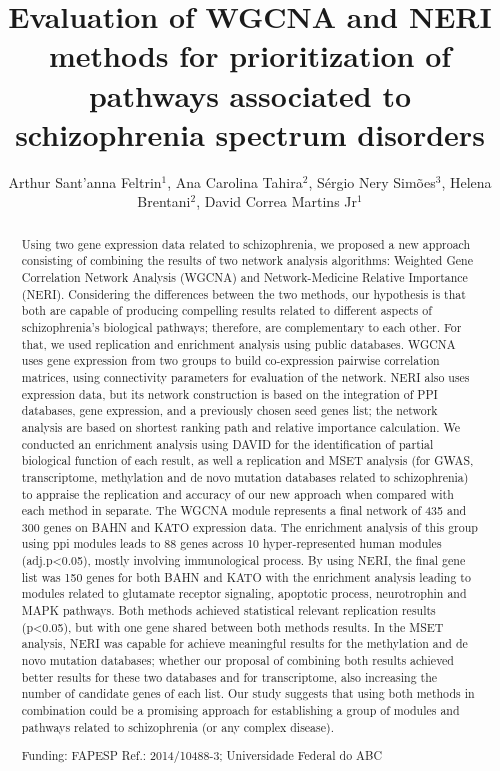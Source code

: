 \documentclass[twoside]{article}
\title{\vspace{-15mm}\fontsize{24pt}{10pt}\selectfont\textbf{Evaluation of WGCNA and NERI methods for prioritization of pathways associated to schizophrenia spectrum disorders}} %
\author{Arthur Sant'anna Feltrin$^1$, Ana Carolina Tahira$^2$, S\'ergio Nery Sim\~oes$^3$, Helena Brentani$^2$, David Correa Martins Jr$^1$}
\affil{1 UFABC\\ 2 USP\\ 3 INSTITUTO FEDERAL DO ESP\'IRITO SANTO\\ }
\date{}
\begin{document}
\maketitle %

\thispagestyle{fancy} %


\begin{abstract}
Using two gene expression data related to schizophrenia, we proposed a new approach consisting of combining the results of two network analysis algorithms: Weighted Gene Correlation Network Analysis (WGCNA) and Network-Medicine Relative Importance (NERI). Considering the differences between the two methods, our hypothesis is that both are capable of producing compelling results related to different aspects of schizophrenia's biological pathways; therefore, are complementary to each other. For that, we used replication and enrichment analysis using public databases. WGCNA uses gene expression from two groups to build co-expression pairwise correlation matrices, using connectivity parameters for evaluation of the network. NERI also uses expression data, but its network construction is based on the integration of PPI databases, gene expression, and a previously chosen seed genes list; the network analysis are based on shortest ranking path and relative importance calculation. We conducted an enrichment analysis using DAVID for the identification of partial biological function of each result, as well a replication and MSET analysis (for GWAS, transcriptome, methylation and de novo mutation databases related to schizophrenia) to appraise the replication and accuracy of our new approach when compared with each method in separate. The WGCNA module represents a final network of 435 and 300 genes on BAHN and KATO expression data. The enrichment analysis of this group using ppi modules leads to 88 genes across 10 hyper-represented human modules (adj.p<0.05), mostly involving immunological process. By using NERI, the final gene list was 150 genes for both BAHN and KATO with the enrichment analysis leading to modules related to glutamate receptor signaling, apoptotic process, neurotrophin and MAPK pathways. Both methods achieved statistical relevant replication results (p<0.05), but with one gene shared between both methods results. In the MSET analysis, NERI was capable for achieve meaningful results for the methylation and de novo mutation databases; whether our proposal of combining both results achieved better results for these two databases and for transcriptome, also increasing the number of candidate genes of each list. Our study suggests that using both methods in combination could be a promising approach for establishing a group of modules and pathways related to schizophrenia (or any complex disease).

Funding: FAPESP Ref.: 2014/10488-3; Universidade Federal do ABC
\end{abstract}
\end{document}
